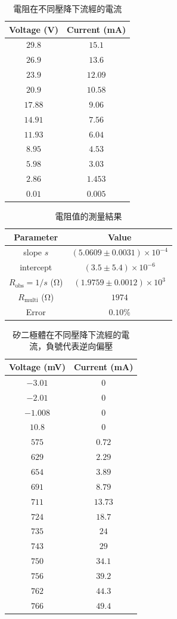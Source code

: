 \begin{table}[htb!]
\centering
\caption{電阻在不同壓降下流經的電流}
\begin{tabular}{cc}
\toprule
Voltage (\unit{\V}) & Current (\unit{\mA}) \\
\midrule
$29.8$ & $15.1$ \\
$26.9$ & $13.6$ \\
$23.9$ & $12.09$ \\
$20.9$ & $10.58$ \\
$17.88$ & $9.06$ \\
$14.91$ & $7.56$ \\
$11.93$ & $6.04$ \\
$8.95$ & $4.53$ \\
$5.98$ & $3.03$ \\
$2.86$ & $1.453$ \\
$0.01$ & $0.005$ \\
\bottomrule
\end{tabular}
\end{table}
\begin{table}[htb!]
\centering
\caption{電阻值的測量結果}
\begin{tabular}{cc}
\toprule
Parameter & Value \\
\midrule
slope $s$ & $(5.0609 \pm 0.0031)\times 10^{-4}$ \\
intercept & $(3.5 \pm 5.4)\times 10^{-6}$ \\
$R_{\text{obs}}=1/s$ (\unit{\ohm}) & $(1.9759 \pm 0.0012)\times 10^{3}$ \\
$R_{\text{multi}}$ (\unit{\ohm}) & $1974$ \\
Error & $0.10\%$ \\
\bottomrule
\end{tabular}
\end{table}
\begin{table}[htb!]
\centering
\caption{矽二極體在不同壓降下流經的電流，負號代表逆向偏壓}
\begin{tabular}{cc}
\toprule
Voltage (\unit{\mV}) & Current (\unit{\mA}) \\
\midrule
$-3.01$ & $0$ \\
$-2.01$ & $0$ \\
$-1.008$ & $0$ \\
$10.8$ & $0$ \\
$575$ & $0.72$ \\
$629$ & $2.29$ \\
$654$ & $3.89$ \\
$691$ & $8.79$ \\
$711$ & $13.73$ \\
$724$ & $18.7$ \\
$735$ & $24$ \\
$743$ & $29$ \\
$750$ & $34.1$ \\
$756$ & $39.2$ \\
$762$ & $44.3$ \\
$766$ & $49.4$ \\
\bottomrule
\end{tabular}
\end{table}
